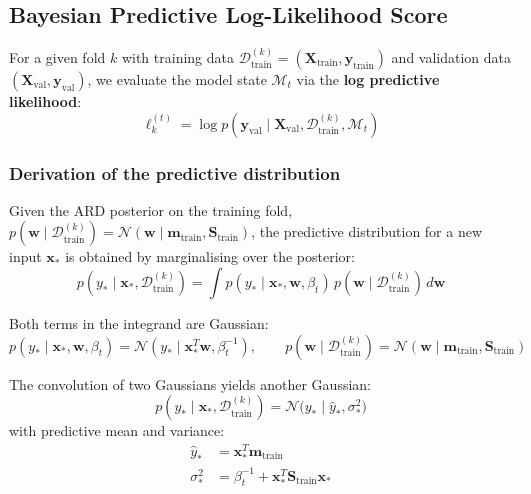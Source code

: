 \documentclass[11pt,a4paper]{article}
\begin{document}
\subsection{Bayesian Predictive Log-Likelihood Score}

For a given fold $k$ with training data $\mathcal{D}_{\text{train}}^{(k)} = (\mathbf{X}_{\text{train}}, \mathbf{y}_{\text{train}})$ and validation data $(\mathbf{X}_{\text{val}}, \mathbf{y}_{\text{val}})$, we evaluate the model state $\mathcal{M}_t$ via the \textbf{log predictive likelihood}:
\begin{equation}
\ell_k^{(t)} = \log p(\mathbf{y}_{\text{val}} \mid \mathbf{X}_{\text{val}}, \mathcal{D}_{\text{train}}^{(k)}, \mathcal{M}_t)
\label{eq:fold_score}
\end{equation}

\subsubsection*{Derivation of the predictive distribution}

Given the ARD posterior on the training fold, $p(\mathbf{w} \mid \mathcal{D}_{\text{train}}^{(k)}) = \mathcal{N}(\mathbf{w} \mid \mathbf{m}_{\text{train}}, \mathbf{S}_{\text{train}})$, the predictive distribution for a new input $\mathbf{x}_*$ is obtained by marginalising over the posterior:
\begin{equation}
p(y_* \mid \mathbf{x}_*, \mathcal{D}_{\text{train}}^{(k)}) = \int p(y_* \mid \mathbf{x}_*, \mathbf{w}, \beta_t) \, p(\mathbf{w} \mid \mathcal{D}_{\text{train}}^{(k)}) \, d\mathbf{w}
\label{eq:predictive_marginal}
\end{equation}

Both terms in the integrand are Gaussian:
\begin{equation}
p(y_* \mid \mathbf{x}_*, \mathbf{w}, \beta_t) = \mathcal{N}(y_* \mid \mathbf{x}_*^T \mathbf{w}, \beta_t^{-1}), \qquad
p(\mathbf{w} \mid \mathcal{D}_{\text{train}}^{(k)}) = \mathcal{N}(\mathbf{w} \mid \mathbf{m}_{\text{train}}, \mathbf{S}_{\text{train}})
\label{eq:both_gaussian}
\end{equation}

The convolution of two Gaussians yields another Gaussian:
\begin{equation}
p(y_* \mid \mathbf{x}_*, \mathcal{D}_{\text{train}}^{(k)}) = \mathcal{N}\bigl(y_* \mid \hat{y}_*, \sigma_*^2\bigr)
\label{eq:predictive_gaussian}
\end{equation}
with predictive mean and variance:
\begin{align}
\hat{y}_* &= \mathbf{x}_*^T \mathbf{m}_{\text{train}} \label{eq:pred_mean} \\
\sigma_*^2 &= \beta_t^{-1} + \mathbf{x}_*^T \mathbf{S}_{\text{train}} \mathbf{x}_* \label{eq:pred_var}
\end{align}
\end{document}
